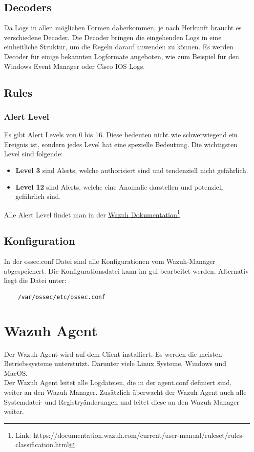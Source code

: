 \subsection{Decoders}
Da Logs in allen möglichen Formen daherkommen, je nach Herkunft braucht es verschiedene Decoder.
Die Decoder bringen die eingehenden Logs in eine einheitliche Struktur, um die Regeln darauf anwenden zu können.
Es werden Decoder für einige bekannten Logformate angeboten, wie zum Beispiel für den Windows Event Manager oder Cisco IOS Logs.\\



\subsection{Rules}


\subsubsection{Alert Level}
Es gibt Alert Levels von 0 bis 16. 
Diese bedeuten nicht wie schwerwiegend ein Ereignis ist, sondern jedes Level hat eine spezielle Bedeutung.
Die wichtigsten Level sind folgende:
\begin{itemize}
    \item \textbf{Level 3} sind Alerts, welche authorisiert sind und tendenziell nicht gefährlich.
    \item \textbf{Level 12} sind Alerts, welche eine Anomalie darstellen und potenziell gefährlich sind.
\end{itemize}

Alle Alert Level findet man in der \href{https://documentation.wazuh.com/current/user-manual/ruleset/rules-classification.html}{Wazuh Dokumentation}\footnote{Link: https://documentation.wazuh.com/current/user-manual/ruleset/rules-classification.html}.


\subsection{Konfiguration}
In der ossec.conf Datei sind alle Konfigurationen vom Wazuh-Manager abgespeichert.
Die Konfigurationsdatei kann im \acrshort{gui} bearbeitet werden. Alternativ liegt die Datei unter:
\begin{lstlisting}
    /var/ossec/etc/ossec.conf
\end{lstlisting}


\section{Wazuh Agent}
Der Wazuh Agent wird auf dem Client installiert.
Es werden die meisten Betriebssysteme unterstützt. Darunter viele Linux Systeme, Windows und MacOS.\\

Der Wazuh Agent leitet alle Logdateien, die in der agent.conf definiert sind, weiter an den Wazuh Manager.
Zusätzlich überwacht der Wazuh Agent auch alle Systemdatei- und Registryänderungen und leitet diese an den Wazuh Manager weiter. 
